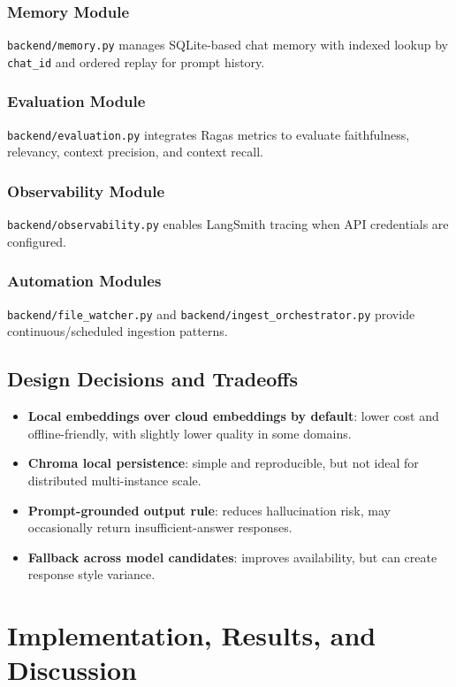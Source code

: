 \documentclass[12pt,letterpaper]{report}
\begin{document}
\subsection{Memory Module}
\texttt{backend/memory.py} manages SQLite-based chat memory with indexed lookup by \texttt{chat\_id} and ordered replay for prompt history.

\subsection{Evaluation Module}
\texttt{backend/evaluation.py} integrates Ragas metrics to evaluate faithfulness, relevancy, context precision, and context recall.

\subsection{Observability Module}
\texttt{backend/observability.py} enables LangSmith tracing when API credentials are configured.

\subsection{Automation Modules}
\texttt{backend/file\_watcher.py} and \texttt{backend/ingest\_orchestrator.py} provide continuous/scheduled ingestion patterns.

\section{Design Decisions and Tradeoffs}
\begin{itemize}
\item \textbf{Local embeddings over cloud embeddings by default}: lower cost and offline-friendly, with slightly lower quality in some domains.
\item \textbf{Chroma local persistence}: simple and reproducible, but not ideal for distributed multi-instance scale.
\item \textbf{Prompt-grounded output rule}: reduces hallucination risk, may occasionally return insufficient-answer responses.
\item \textbf{Fallback across model candidates}: improves availability, but can create response style variance.
\end{itemize}

\chapter{Implementation, Results, and Discussion}
\end{document}

